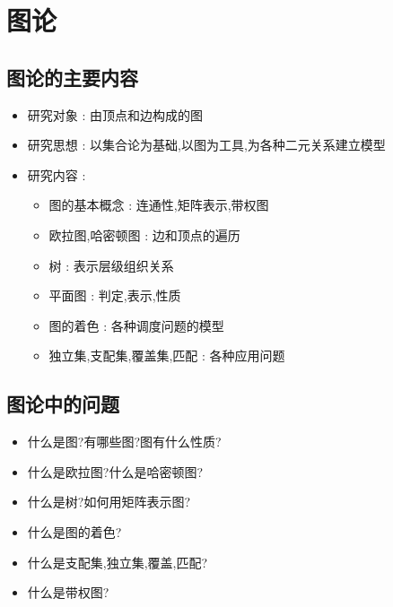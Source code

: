 {{}%

\section{图论}{

  \subsection{图论的主要内容}{
    \begin{itemize}
      \item 研究对象 : 由顶点和边构成的图
      \item 研究思想 : 以集合论为基础,以图为工具,为各种二元关系建立模型
      \item 研究内容 : \begin{itemize}
              \item 图的基本概念 : 连通性,矩阵表示,带权图
              \item 欧拉图,哈密顿图 : 边和顶点的遍历
              \item 树 : 表示层级组织关系
              \item 平面图 : 判定,表示,性质
              \item 图的着色 : 各种调度问题的模型
              \item 独立集,支配集,覆盖集,匹配 : 各种应用问题
            \end{itemize}
    \end{itemize}
  }%

  \subsection{图论中的问题}{
    \begin{itemize}
      \item 什么是图?有哪些图?图有什么性质?
      \item 什么是欧拉图?什么是哈密顿图?
      \item 什么是树?如何用矩阵表示图?
      \item 什么是图的着色?
      \item 什么是支配集,独立集,覆盖,匹配?
      \item 什么是带权图?
    \end{itemize}
  }%

 }%

}%